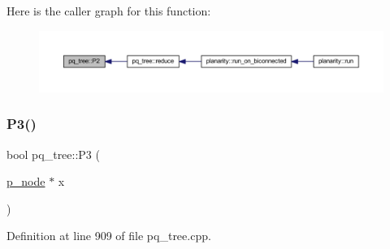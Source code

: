 Here is the caller graph for this function\+:\nopagebreak
\begin{figure}[H]
\begin{center}
\leavevmode
\includegraphics[width=350pt]{classpq__tree_a38e09d7b7f7627dde9cb20a869e09e96_icgraph}
\end{center}
\end{figure}
\mbox{\label{classpq__tree_a8afbdc0f1163021d5ca651c32a1da1d3}} 
\subsubsection{\texorpdfstring{P3()}{P3()}}
{\footnotesize\ttfamily bool pq\+\_\+tree\+::\+P3 (\begin{DoxyParamCaption}\item[{\mbox{\hyperlink{classp__node}{p\+\_\+node}} $\ast$}]{x }\end{DoxyParamCaption})\hspace{0.3cm}{\ttfamily [private]}}



Definition at line 909 of file pq\+\_\+tree.\+cpp.


